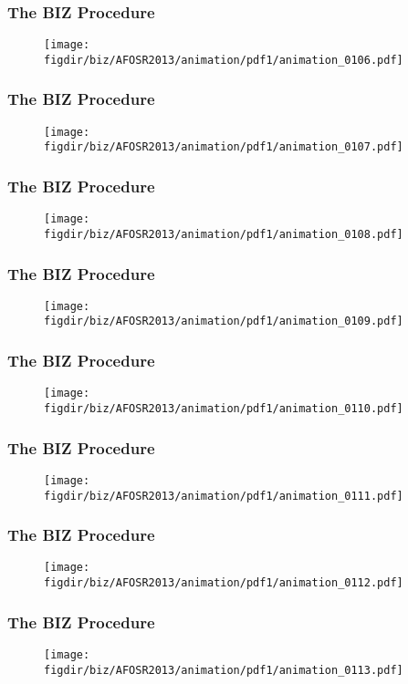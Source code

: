 \documentclass[13pt]{beamer}
\newcommand{\figdir}{../../fig}
\begin{document}
{\begin{frame}\frametitle{The BIZ Procedure}\begin{figure}\texttt{[image: \\figdir/biz/AFOSR2013/animation/pdf1/animation\_0106.pdf]}\end{figure}\end{frame}
\begin{frame}\frametitle{The BIZ Procedure}\begin{figure}\texttt{[image: \\figdir/biz/AFOSR2013/animation/pdf1/animation\_0107.pdf]}\end{figure}\end{frame}
\begin{frame}\frametitle{The BIZ Procedure}\begin{figure}\texttt{[image: \\figdir/biz/AFOSR2013/animation/pdf1/animation\_0108.pdf]}\end{figure}\end{frame}
\begin{frame}\frametitle{The BIZ Procedure}\begin{figure}\texttt{[image: \\figdir/biz/AFOSR2013/animation/pdf1/animation\_0109.pdf]}\end{figure}\end{frame}
\begin{frame}\frametitle{The BIZ Procedure}\begin{figure}\texttt{[image: \\figdir/biz/AFOSR2013/animation/pdf1/animation\_0110.pdf]}\end{figure}\end{frame}
\begin{frame}\frametitle{The BIZ Procedure}\begin{figure}\texttt{[image: \\figdir/biz/AFOSR2013/animation/pdf1/animation\_0111.pdf]}\end{figure}\end{frame}
\begin{frame}\frametitle{The BIZ Procedure}\begin{figure}\texttt{[image: \\figdir/biz/AFOSR2013/animation/pdf1/animation\_0112.pdf]}\end{figure}\end{frame}
\begin{frame}\frametitle{The BIZ Procedure}\begin{figure}\texttt{[image: \\figdir/biz/AFOSR2013/animation/pdf1/animation\_0113.pdf]}\end{figure}\end{frame}
}
\end{document}
